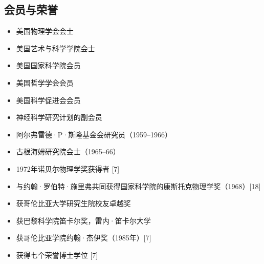 \subsection{会员与荣誉}
\begin{itemize}
\item 美国物理学会会士 
\item 美国艺术与科学学院会士 
\item 美国国家科学院会员
\item 美国哲学学会会员 
\item 美国科学促进会会员 
\item 神经科学研究计划的副会员 
\item 阿尔弗雷德·P·斯隆基金会研究员（1959–1966）
\item 古根海姆研究院会士（1965–66）
\item 1972年诺贝尔物理学奖获得者 [7]
\item 与约翰·罗伯特·施里弗共同获得国家科学院的康斯托克物理学奖（1968）[18]
\item 获哥伦比亚大学研究生院校友卓越奖 
\item 获巴黎科学院笛卡尔奖，雷内·笛卡尔大学
\item 获哥伦比亚学院约翰·杰伊奖（1985年）[7]
\item 获得七个荣誉博士学位 [7]
\end{itemize}
